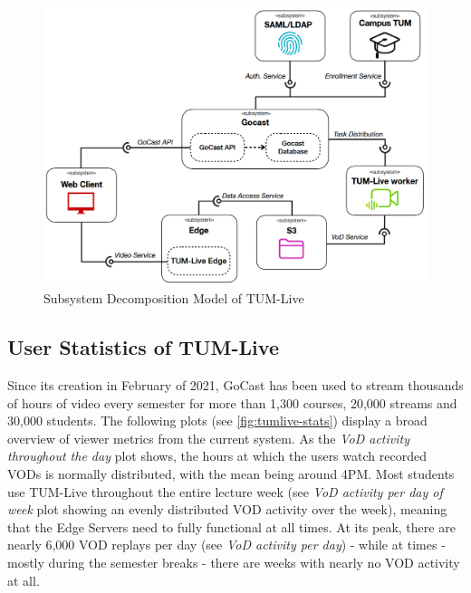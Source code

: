 \begin{figure}[htpb]
    \centering
    \includegraphics[width=420pt]{images/OldDeploymentDiagram2.png}
    \caption[Subsystem Decomposition]{Subsystem Decomposition Model of TUM-Live}\label{fig:old-system-architecture}
\end{figure}

\subsection{User Statistics of TUM-Live}\label{subsection:user-stats-tumlive}

Since its creation in February of 2021, GoCast has been used to stream thousands of hours of video every semester for more than 1,300 courses, 20,000 streams and 30,000 students. The following plots (see \autoref{fig:tumlive-stats}) display a broad overview of viewer metrics from the current system. As the \textit{VoD activity throughout the day} plot shows, the hours at which the users watch recorded \ac{VOD}s is normally distributed, with the mean being around 4PM. Most students use TUM-Live throughout the entire lecture week (see \textit{VoD activity per day of week} plot showing an evenly distributed \ac{VOD} activity over the week), meaning that the Edge Servers need to fully functional at all times. At its peak, there are nearly 6,000 \ac{VOD} replays per day (see \textit{VoD activity per day}) - while at times - mostly during the semester breaks - there are weeks with nearly no \ac{VOD} activity at all.

